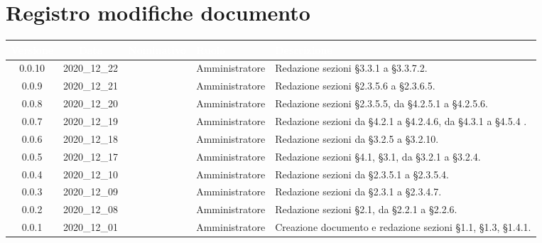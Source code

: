 \section*{Registro modifiche documento}
{
\renewcommand{\arraystretch}{1.5}
\centering
\begin{longtable}{ c c  C{2.3cm} C{3cm} C{3.2cm}}


 \textcolor{white}{\textbf{Versione}}&
    \textcolor{white}{\textbf{Data}}&
    \textcolor{white}{\textbf{Nominativo}}&
    \textcolor{white}{\textbf{Ruolo}}&
    \textcolor{white}{\textbf{Descrizione}}\\	
    \endhead
    
     0.0.10 & 2020\_12\_22 & \TG{}  & Amministratore & Redazione sezioni \S3.3.1 a \S3.3.7.2. \\
    
    0.0.9 & 2020\_12\_21 & \TG{}  & Amministratore & Redazione sezioni \S2.3.5.6 a \S2.3.6.5. \\
    
    0.0.8 & 2020\_12\_20 & \TG{}  & Amministratore & Redazione sezioni \S2.3.5.5, da \S4.2.5.1 a \S4.2.5.6. \\
    
     0.0.7 & 2020\_12\_19 & \TG{}  & Amministratore & Redazione sezioni da \S4.2.1 a \S4.2.4.6, da \S4.3.1 a \S4.5.4 . \\
    
    0.0.6 & 2020\_12\_18 & \TG{}  & Amministratore & Redazione sezioni da \S3.2.5 a \S3.2.10. \\
    
    0.0.5 & 2020\_12\_17 & \TG{} & Amministratore  & Redazione sezioni \S4.1, \S3.1, da \S3.2.1 a \S3.2.4. \\
    
     0.0.4 & 2020\_12\_10 & \TG{} & Amministratore  & Redazione sezioni da \S2.3.5.1 a \S2.3.5.4. \\
    
     0.0.3 & 2020\_12\_09 & \TG{} & Amministratore  & Redazione sezioni da \S2.3.1 a \S2.3.4.7.  \\
     
     0.0.2 & 2020\_12\_08 & \TG{} & Amministratore  & Redazione sezioni \S2.1, da \S2.2.1 a \S2.2.6.  \\      
            
    0.0.1 & 2020\_12\_01 & \TG{} & Amministratore  & Creazione documento e redazione sezioni \S1.1, \S1.3, \S1.4.1.  \\
			
\end{longtable}
}